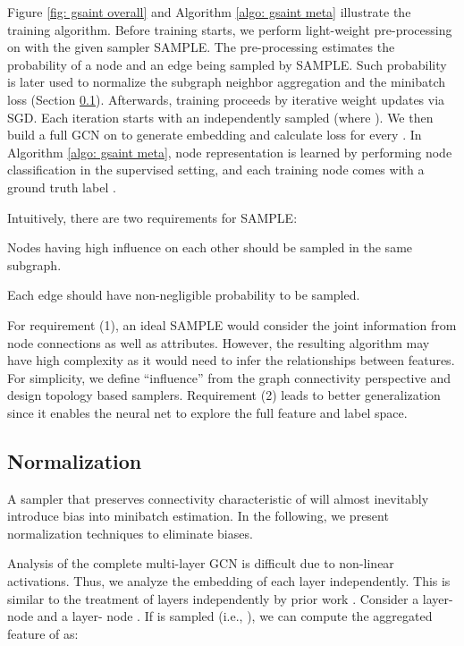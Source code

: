 \documentclass{article} \usepackage{iclr2020_conference,times}
\newcommand{\sample}{{\fontfamily{lmtt}\selectfont SAMPLE}}
\begin{document}
Figure \ref{fig: gsaint overall} and Algorithm \ref{algo: gsaint meta} illustrate the training algorithm. 
Before training starts, we perform light-weight pre-processing on  with the given sampler \sample. The pre-processing estimates the probability of a node  and an edge  being sampled by {\sample}. Such probability is later used to normalize  the subgraph neighbor aggregation and the minibatch loss (Section \ref{sec: bias}). Afterwards, training proceeds by iterative weight updates via SGD. 
Each iteration starts with an independently sampled  (where ). We then build a full GCN on  to generate embedding and calculate loss for every . 
In Algorithm \ref{algo: gsaint meta}, node representation is learned by performing node classification in the supervised setting, and each training node  comes with a ground truth label . 

Intuitively, there are two requirements for {\sample}: 
\begin{enumerate*}
    \item Nodes having high influence on each other should be sampled in the same subgraph.
    \item Each edge should have non-negligible probability to be sampled. 
\end{enumerate*}
For requirement (1), an ideal {\sample} would consider the joint information from node connections as well as attributes. However, the resulting algorithm may have high complexity as it would need to infer the relationships between features. For simplicity, we define ``influence'' from the graph connectivity perspective and design topology based samplers. 
Requirement (2) leads to better generalization since it enables the neural net to explore the full feature and label space. 






\subsection{Normalization}
\label{sec: bias}





A sampler that preserves connectivity characteristic of  will almost inevitably introduce bias into minibatch estimation. 
In the following, we present normalization techniques to eliminate biases. 

Analysis of the complete multi-layer GCN is difficult due to non-linear activations. Thus, we analyze the embedding of each layer independently. 
This is similar to the treatment of layers independently by prior work \citep{fastgcn,as-gcn}.
Consider a layer- node  and a layer- node . If  is sampled (i.e., ), we can compute the aggregated feature of  as:
\end{document}
